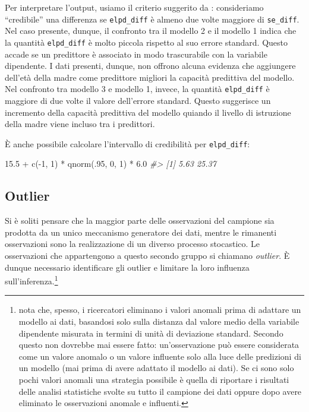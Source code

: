 \documentclass[
  10pt,
  italian,
  a4paper,
  extrafontsizes,onecolumn,openright
  ]{memoir}
\newenvironment{Shaded}{\begin{snugshade}}{\end{snugshade}}
\newcommand{\CommentTok}[1]{\textcolor[rgb]{0.56,0.35,0.01}{\textit{#1}}}
\newcommand{\DecValTok}[1]{\textcolor[rgb]{0.00,0.00,0.81}{#1}}
\newcommand{\FloatTok}[1]{\textcolor[rgb]{0.00,0.00,0.81}{#1}}
\newcommand{\FunctionTok}[1]{\textcolor[rgb]{0.00,0.00,0.00}{#1}}
\newcommand{\NormalTok}[1]{#1}
\newcommand{\SpecialCharTok}[1]{\textcolor[rgb]{0.00,0.00,0.00}{#1}}
\theoremstyle{definition}
\theoremstyle{definition}
\theoremstyle{definition}
\theoremstyle{definition}
\theoremstyle{remark}
\begin{document}
Per interpretare l'output, usiamo il criterio suggerito da \textcite{gelman1995bayesian}: consideriamo ``credibile'' una differenza se \texttt{elpd\_diff} è almeno due volte maggiore di \texttt{se\_diff}. Nel caso presente, dunque, il confronto tra il modello 2 e il modello 1 indica che la quantità \texttt{elpd\_diff} è molto piccola rispetto al suo errore standard.
Questo accade se un predittore è associato in modo trascurabile con la variabile dipendente. I dati presenti, dunque, non offrono alcuna evidenza che aggiungere dell'età della madre come predittore migliori la capacità predittiva del modello. Nel confronto tra modello 3 e modello 1, invece, la quantità \texttt{elpd\_diff} è maggiore di due volte il valore dell'errore standard. Questo suggerisce un incremento della capacità predittiva del modello quiando il livello di istruzione della madre viene incluso tra i predittori.

È anche possibile calcolare l'intervallo di credibilità per \texttt{elpd\_diff}:

\begin{Shaded}
\begin{Highlighting}[]
\FloatTok{15.5} \SpecialCharTok{+} \FunctionTok{c}\NormalTok{(}\SpecialCharTok{{-}}\DecValTok{1}\NormalTok{, }\DecValTok{1}\NormalTok{) }\SpecialCharTok{*} \FunctionTok{qnorm}\NormalTok{(.}\DecValTok{95}\NormalTok{, }\DecValTok{0}\NormalTok{, }\DecValTok{1}\NormalTok{) }\SpecialCharTok{*} \FloatTok{6.0}
\CommentTok{\#\textgreater{} [1]  5.63 25.37}
\end{Highlighting}
\end{Shaded}

\hypertarget{outlier}{%
\subsection{Outlier}\label{outlier}}

Si è soliti pensare che la maggior parte delle osservazioni del campione sia prodotta da un unico meccanismo generatore dei dati, mentre le rimanenti osservazioni sono la realizzazione di un diverso processo stocastico. Le osservazioni che appartengono a questo secondo gruppo si chiamano \emph{outlier}. È dunque necessario identificare gli outlier e limitare la loro influenza sull'inferenza.\footnote{\textcite{McElreath_rethinking} nota che, spesso, i ricercatori eliminano i valori anomali prima di adattare un modello ai dati, basandosi solo sulla distanza dal valore medio della variabile dipendente misurata in termini di unità di deviazione standard. Secondo \textcite{McElreath_rethinking} questo non dovrebbe mai essere fatto: un'osservazione può essere considerata come un valore anomalo o un valore influente solo alla luce delle predizioni di un modello (mai prima di avere adattato il modello ai dati). Se ci sono solo pochi valori anomali una strategia possibile è quella di riportare i risultati delle analisi statistiche svolte su tutto il campione dei dati oppure dopo avere eliminato le osservazioni anomale e influenti.}
\end{document}
